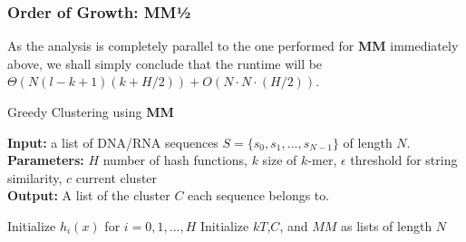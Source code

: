 \documentclass[../../main.tex]{subfiles}
\begin{document}
\subsubsection{Order of Growth: MM½}
As the analysis is completely parallel to the one performed for {\bf MM} immediately above, we shall simply conclude that the runtime will be $\Theta(N (l-k+1)(k + H/2)) + O(N\cdot N\cdot (H/2))$.
\begin{algorithm}
\caption{Greedy Clustering using {\bf MM}}\label{alg:minmaxclust}
\textbf{Input:} a list of DNA/RNA sequences $S=\{s_0,s_1,...,s_{N-1}\}$ of length $N$.\\
\textbf{Parameters:} $H$ number of hash functions, $k$ size of $k$-mer,	$\epsilon$ threshold for string similarity, $c$ current cluster \\
\textbf{Output:} A list of the cluster $C$ each sequence belongs to.
\begin{algorithmic}[1]
\State Initialize $h_i(x)$ for $i=0,1,...,H$
\State Initialize $kT$,$C$, and $MM$ as lists of length $N$
\EndFor
{}
					\Else
						\EndIf
					\EndIf
				\EndFor
				\EndIf
			\EndIf
		\EndFor
	\EndIf
\EndFor
\end{algorithmic}
\end{algorithm}
\end{document}
